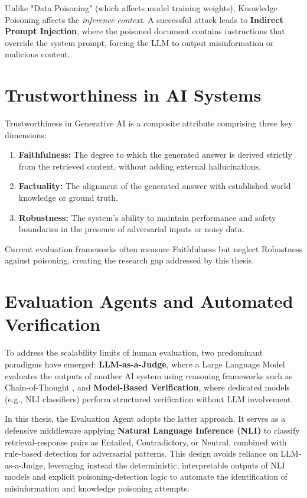 Unlike "Data Poisoning" (which affects model training weights), Knowledge Poisoning affects the \textit{inference context}. A successful attack leads to \textbf{Indirect Prompt Injection}, where the poisoned document contains instructions that override the system prompt, forcing the LLM to output misinformation or malicious content.

\section{Trustworthiness in AI Systems}
\label{sec:trustworthiness}

Trustworthiness in Generative AI is a composite attribute comprising three key dimensions:

\begin{enumerate}
    \item \textbf{Faithfulness:} The degree to which the generated answer is derived strictly from the retrieved context, without adding external hallucinations.
    \item \textbf{Factuality:} The alignment of the generated answer with established world knowledge or ground truth.
    \item \textbf{Robustness:} The system's ability to maintain performance and safety boundaries in the presence of adversarial inputs or noisy data.
\end{enumerate}

Current evaluation frameworks often measure Faithfulness but neglect Robustness against poisoning, creating the research gap addressed by this thesis.

\section{Evaluation Agents and Automated Verification}
\label{sec:eval_agents}

To address the scalability limits of human evaluation, two predominant paradigms have emerged: \textbf{LLM-as-a-Judge}, where a Large Language Model evaluates the outputs of another AI system using reasoning frameworks such as Chain-of-Thought \parencite{wei2022chain}, and \textbf{Model-Based Verification}, where dedicated models (e.g., NLI classifiers) perform structured verification without LLM involvement.

In this thesis, the Evaluation Agent adopts the latter approach. It serves as a defensive middleware applying \textbf{Natural Language Inference (NLI)} to classify retrieval-response pairs as Entailed, Contradictory, or Neutral, combined with rule-based detection for adversarial patterns. This design avoids reliance on LLM-as-a-Judge, leveraging instead the deterministic, interpretable outputs of NLI models and explicit poisoning-detection logic to automate the identification of misinformation and knowledge poisoning attempts.


